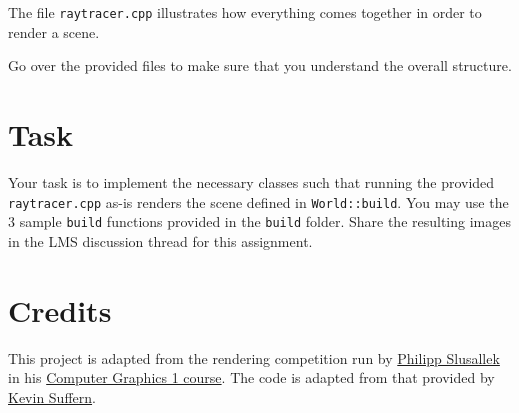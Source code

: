 \documentclass{article}
\begin{document}
The file \texttt{raytracer.cpp} illustrates how everything comes together in order to render a scene.

Go over the provided files to make sure that you understand the overall structure.
  
\section*{Task}
Your task is to implement the necessary classes such that running the  provided \texttt{raytracer.cpp} as-is renders the scene defined in \texttt{World::build}. You may use the 3 sample \texttt{build} functions provided in the \texttt{build} folder. Share the resulting images in the LMS discussion thread for this assignment.

\section*{Credits}

This project is adapted from the rendering competition run by \href{https://graphics.cg.uni-saarland.de/people/slusallek.html}{Philipp Slusallek} in his \href{https://graphics.cg.uni-saarland.de/courses/cg1-2018/}{Computer Graphics 1 course}. The code is adapted from that provided by \href{http://www.raytracegroundup.com/}{Kevin Suffern}.
\end{document}
